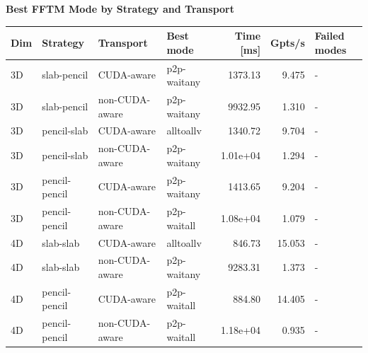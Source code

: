\documentclass{article}
\begin{document}
\begin{center}
{\fontsize{8.0pt}{9.4pt}\selectfont
\textbf{Best FFTM Mode by Strategy and Transport}

\vspace{0.6em}
\begin{tabular}{llllrrl}
\hline
Dim & Strategy & Transport & Best mode & Time [ms] & Gpts/s & Failed modes \\
\hline
3D & slab-pencil & CUDA-aware & p2p-waitany & 1373.13 & 9.475 & - \\
3D & slab-pencil & non-CUDA-aware & p2p-waitany & 9932.95 & 1.310 & - \\
3D & pencil-slab & CUDA-aware & alltoallv & 1340.72 & 9.704 & - \\
3D & pencil-slab & non-CUDA-aware & p2p-waitany & 1.01e+04 & 1.294 & - \\
3D & pencil-pencil & CUDA-aware & p2p-waitany & 1413.65 & 9.204 & - \\
3D & pencil-pencil & non-CUDA-aware & p2p-waitall & 1.08e+04 & 1.079 & - \\
4D & slab-slab & CUDA-aware & alltoallv & 846.73 & 15.053 & - \\
4D & slab-slab & non-CUDA-aware & p2p-waitany & 9283.31 & 1.373 & - \\
4D & pencil-pencil & CUDA-aware & p2p-waitall & 884.80 & 14.405 & - \\
4D & pencil-pencil & non-CUDA-aware & p2p-waitall & 1.18e+04 & 0.935 & - \\
\hline
\end{tabular}
}
\end{center}
\end{document}
